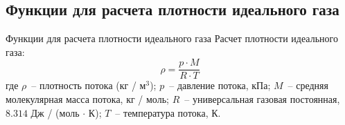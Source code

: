 \documentclass[aspectratio=169, mathserif]{beamer}%
\begin{document}
\subsection{Функции для расчета плотности идеального газа}
\begin{frame}[fragile, label=c]{Функции для расчета плотности идеального газа}
\scriptsize
Расчет плотности идеального газа:
\vfill
\begin{equation*}
	\rho = \dfrac{p \cdot M}{R \cdot T}
\end{equation*}
\vfill
где $\rho$~-- плотность потока (кг / м$^3$); $p$~-- давление потока, кПа; $M$~-- средняя молекулярная масса потока, кг / моль; $R$~-- универсальная газовая постоянная, $8.314$ Дж / (моль $\cdot$ К); $T$~-- температура потока, К.
\vfill
\end{frame}
\end{document}
